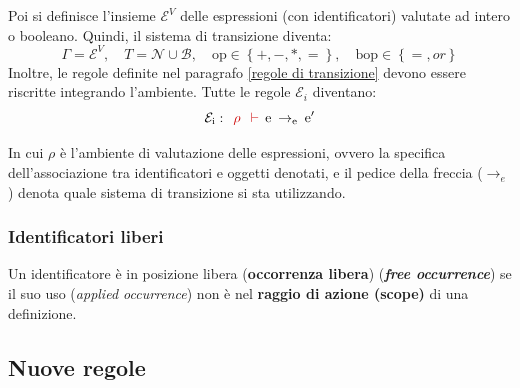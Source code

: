 \documentclass[a4paper]{article}
\begin{document}
	\noindent
	Poi si definisce l'insieme $\mathcal{E}^{V}$ delle espressioni (con identificatori) valutate ad intero o booleano. Quindi, il sistema di transizione diventa:
	\begin{equation*}
		\Gamma = \mathcal{E}^{V}, \hspace{1em} T = \mathcal{N} \cup \mathcal{B}, \hspace{1em} \mathrm{op} \in \left\{+,-,*,=\right\}, \hspace{1em} \mathrm{bop} \in \left\{=, or\right\}
	\end{equation*}
	Inoltre, le regole definite nel paragrafo \ref{regole di transizione} devono essere riscritte integrando l'ambiente. Tutte le regole $\mathcal{E}_{i}$ diventano:
	\begin{equation*}
		\mathcal{E}_{\mathrm{i}} : \:\: \textcolor{Red3}{\rho \:\: \vdash} \:\: \mathrm{e} \: \rightarrow_{\mathrm{e}} \: \mathrm{e}'
	\end{equation*}

	\noindent
	In cui $\rho$ è l'ambiente di valutazione delle espressioni, ovvero la specifica dell'associazione tra identificatori e oggetti denotati, e il pedice della freccia ($\rightarrow_{e}$) denota quale sistema di transizione si sta utilizzando.\newpage
	
	
	\subsubsection{Identificatori liberi}
	
	\begin{boxdef}
		Un identificatore è in posizione libera (\textcolor{Red3}{\textbf{occorrenza libera}}) (\textbf{\emph{free occurrence}}) se il suo uso (\emph{applied occurrence}) non è nel \textbf{raggio di azione (scope)} di una definizione.
	\end{boxdef}\newpage
	
	
	\subsection{Nuove regole}\label{nuove regole}
	
\end{document}
